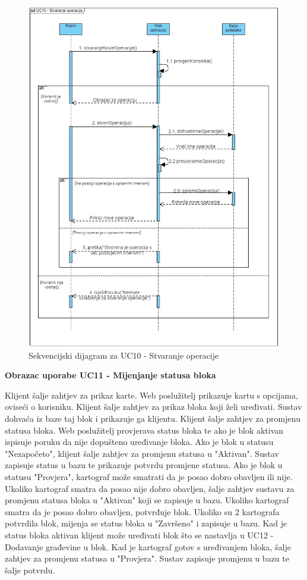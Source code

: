                \begin{figure}[H] \includegraphics[width=\linewidth]{./dijagrami/StvaranjeOperacije.jpg}
				    \caption{Sekvencijski dijagram za UC10 - Stvaranje operacije}
				    \end{figure}

            	\eject

				\textbf{Obrazac uporabe UC11 - Mijenjanje statusa bloka}

                Klijent šalje zahtjev za prikaz karte. Web poslužitelj prikazuje kartu s opcijama, oviseći o korisniku. Klijent šalje zahtjev za prikaz bloka koji želi uređivati. Sustav dohvaća iz baze taj blok i prikazuje ga klijentu. Klijent šalje zahtjev za promjenu statusa bloka. Web poslužitelj provjerava status bloka te ako je blok aktivan ispisuje poruku da nije dopušteno uređivanje bloka. Ako je blok u statusu "Nezapočeto", klijent šalje zahtjev za promjenu statusa u "Aktivan". Sustav zapisuje status u bazu te prikazuje potvrdu promjene statusa. Ako je blok u statusu "Provjera", kartograf može smatrati da je posao dobro obavljen ili nije. Ukoliko kartograf smatra da posao nije dobro obavljen, šalje zahtjev sustavu za promjenu statusa bloka u "Aktivan" koji se zapisuje u bazu. Ukoliko kartograf smatra da je posao dobro obavljen, potvrđuje blok. Ukoliko su 2 kartografa potvrdila blok, mijenja se status bloka u "Završeno" i zapisuje u bazu. Kad je status bloka aktivan klijent može uređivati blok što se nastavlja u UC12 - Dodavanje građevine u blok. Kad je kartograf gotov s uređivanjem bloka, šalje zahtjev za promjenu statusa u "Provjera". Sustav zapisuje promjenu u bazu te šalje potvrdu.

